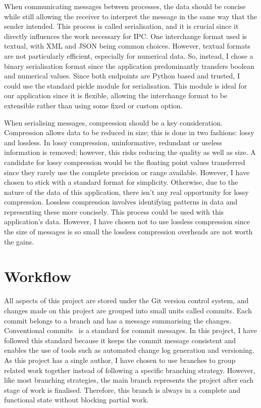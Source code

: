 \documentclass[]{final_report}
\begin{document}
When communicating messages between processes, the data should be concise while still allowing the receiver to interpret the message in the same way that the sender intended. This process is called serialisation, and it is crucial since it directly influences the work necessary for IPC. One interchange format used is textual, with XML and JSON being common choices. However, textual formats are not particularly efficient, especially for numerical data. So, instead, I chose a binary serialisation format since the application predominantly transfers boolean and numerical values. Since both endpoints are Python based and trusted, I could use the standard pickle module for serialisation. This module is ideal for our application since it is flexible, allowing the interchange format to be extensible rather than using some fixed or custom option. 

When serialising messages, compression should be a key consideration. Compression allows data to be reduced in size; this is done in two fashions: lossy and lossless. In lossy compression, uninformative, redundant or useless information is removed; however, this risks reducing the quality as well as size. A candidate for lossy compression would be the floating point values transferred since they rarely use the complete precision or range available. However, I have chosen to stick with a standard format for simplicity. Otherwise, due to the nature of the data of this application, there isn't any real opportunity for lossy compression. Lossless compression involves identifying patterns in data and representing these more concisely. This process could be used with this application's data. However, I have chosen not to use lossless compression since the size of messages is so small the lossless compression overheads are not worth the gains. 

\section{Workflow}


All aspects of this project are stored under the Git version control system, and changes made on this project are grouped into small units called commits. Each commit belongs to a branch and has a message summarising the changes. Conventional commits~\cite{conventionalCommitsOnline} is a standard for commit messages. In this project, I have followed this standard because it keeps the commit message consistent and enables the use of tools such as automated change log generation and versioning. As this project has a single author, I have chosen to use branches to group related work together instead of following a specific branching strategy. However, like most branching strategies, the main branch represents the project after each stage of work is finalised. Therefore, this branch is always in a complete and functional state without blocking partial work. 
\end{document}
